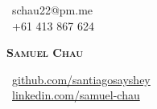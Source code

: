 
\begin{adjustwidth}{0.15in}{0.15in} %
  \begin{minipage}[c]{0.97\textwidth} %
    \begin{minipage}[c]{0.30\textwidth}
      \raggedright
      \small
      \faEnvelope\ schau22@pm.me \\
      \faPhone\ +61 413 867 624
    \end{minipage}%
    \begin{minipage}[c]{0.40\textwidth}
      \centering
      \textbf{\Huge \scshape Samuel Chau}
    \end{minipage}%
    \begin{minipage}[c]{0.30\textwidth}
      \raggedleft
      \small
      \faGithub\ \href{https://github.com/santiagosayshey}{github.com/santiagosayshey} \\
      \faLinkedin\ \href{https://linkedin.com/in/samuel-chau-7324a0305/}{linkedin.com/samuel-chau}
    \end{minipage}
  \end{minipage}
\end{adjustwidth}
\vspace{10pt} %